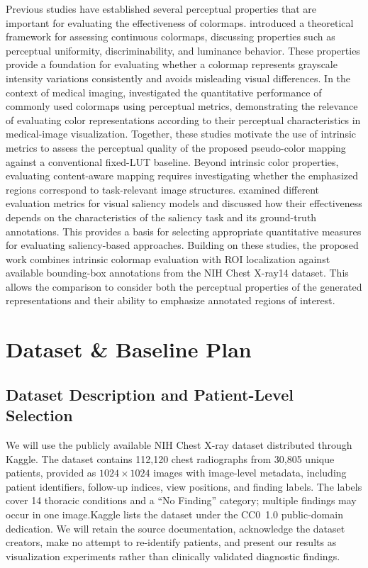 \documentclass[11pt]{article}
\begin{document}
Previous studies have established several perceptual properties that are important for evaluating the effectiveness of colormaps. \cite{bujack2018colormaps} introduced a theoretical framework for assessing continuous colormaps, discussing properties such as perceptual uniformity, discriminability, and luminance behavior. These properties provide a foundation for evaluating whether a colormap represents grayscale intensity variations consistently and avoids misleading visual differences. In the context of medical imaging, \cite{qutbi2024colormaps} investigated the quantitative performance of commonly used colormaps using perceptual metrics, demonstrating the relevance of evaluating color representations according to their perceptual characteristics in medical-image visualization. Together, these studies motivate the use of intrinsic metrics to assess the perceptual quality of the proposed pseudo-color mapping against a conventional fixed-LUT baseline.
Beyond intrinsic color properties, evaluating content-aware mapping requires investigating whether the emphasized regions correspond to task-relevant image structures. \cite{bylinskii2019saliency} examined different evaluation metrics for visual saliency models and discussed how their effectiveness depends on the characteristics of the saliency task and its ground-truth annotations. This provides a basis for selecting appropriate quantitative measures for evaluating saliency-based approaches. Building on these studies, the proposed work combines intrinsic colormap evaluation with ROI localization against available bounding-box annotations from the NIH Chest X-ray14 dataset. This allows the comparison to consider both the perceptual properties of the generated representations and their ability to emphasize annotated regions of interest.


\section{Dataset \& Baseline Plan}
\label{sec:data}

\subsection{Dataset Description and Patient-Level Selection}

We will use the publicly available NIH Chest X-ray dataset \cite{wang2017chestxray8} distributed
through Kaggle. The dataset contains 112,120 chest radiographs from
30,805 unique patients, provided as $1024 \times 1024$ images with
image-level metadata, including patient identifiers, follow-up indices,
view positions, and finding labels. The labels cover 14 thoracic
conditions and a ``No Finding'' category; multiple findings may occur
in one image.Kaggle lists the dataset under the CC0~1.0 public-domain dedication. We will retain the
source documentation, acknowledge the dataset creators, make no attempt
to re-identify patients, and present our results as visualization
experiments rather than clinically validated diagnostic findings.
\end{document}
